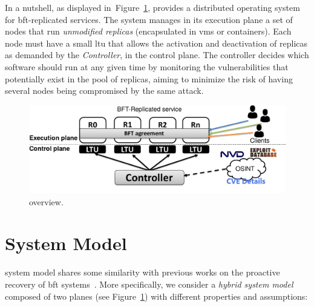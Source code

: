 


In a nutshell, as displayed in~Figure~\ref{fig:overview}, \system provides a distributed operating system for \gls{bft}-replicated services.
The system manages in its execution plane a set of nodes that run \emph{unmodified replicas} (encapsulated in \glspl{vm} or containers). 
Each node must have a small \gls{ltu} that allows the activation and deactivation of replicas as demanded by the \system \emph{Controller}, in the control plane.
The controller decides which software should run at any given time by monitoring the vulnerabilities that potentially exist in the pool of replicas, aiming to minimize the risk of having several nodes being compromised by the same attack.

\begin{figure}[h]
\begin{center}
\includegraphics[width=0.7\columnwidth]{images/images/overview.pdf}
\vspace{-5mm}
\caption{\system overview.}
\label{fig:overview}
\end{center}
\end{figure}


\section{System Model}
\label{sec:systemmodel}

\system system model shares some similarity with previous works on the proactive recovery of \gls{bft} systems~\cite{Castro:2002,Platania:2014,Sousa:2010,Roeder:2010}.
More specifically, we consider a \emph{hybrid system model} composed of two planes (see Figure~\ref{fig:overview}) with different properties and assumptions:

